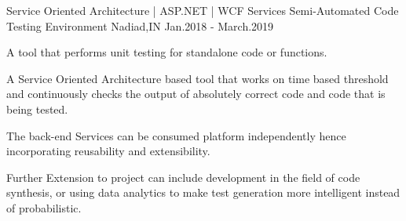 \begin{cventries}
\cventry
{Service Oriented Architecture | ASP.NET | WCF Services} %
{Semi-Automated Code Testing Environment} %
{Nadiad,IN} %
{Jan.2018 - March.2019} %
{ %
\begin{cvitems}
\item {A tool that performs unit testing for standalone code or functions.}
\item {A Service Oriented Architecture based tool that works on time based threshold and continuously checks the output of absolutely correct code and code that is being tested.}
\item {The back-end Services can be consumed platform independently hence incorporating reusability and extensibility.}
\item {Further Extension to project can include development in the field of code synthesis, or using data analytics to make test generation more intelligent instead of probabilistic.}
\end{cvitems}
}






\end{cventries}